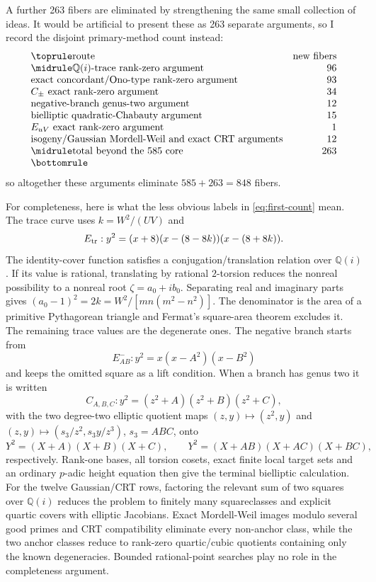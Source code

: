 \documentclass[11pt,a4paper]{amsart}
\newcommand{\Q}{\mathbb Q}
\begin{document}
A further 263 fibers are eliminated by strengthening the same small collection of ideas. It would be artificial to present these as 263 separate arguments, so I record the disjoint primary-method count instead:
\begin{equation}\label{eq:first-count}
\begin{array}{lr}
\toprule
\text{route} & \text{new fibers}\\
\midrule
\Q(i)\text{-trace rank-zero argument} & 96\\
\text{exact concordant/Ono-type rank-zero argument} & 93\\
C_\pm\text{ exact rank-zero argument} & 34\\
\text{negative-branch genus-two argument} & 12\\
\text{bielliptic quadratic-Chabauty argument} & 15\\
E_{uV}\text{ exact rank-zero argument} & 1\\
\text{isogeny/Gaussian Mordell-Weil and exact CRT arguments} & 12\\
\midrule
\text{total beyond the 585 core} & 263\\
\bottomrule
\end{array}
\end{equation}
so altogether these arguments eliminate $585+263=848$ fibers.

For completeness, here is what the less obvious labels in \eqref{eq:first-count} mean. The trace curve uses $k=W^2/(UV)$ and
\[
E_{\rm tr}:y^2=(x+8)(x-(8-8k))(x-(8+8k)).
\]
The identity-cover function satisfies a conjugation/translation relation over $\Q(i)$. If its value is rational, translating by rational $2$-torsion reduces the nonreal possibility to a nonreal root $\zeta=a_0+ib_0$. Separating real and imaginary parts gives $(a_0-1)^2=2k=W^2/[mn(m^2-n^2)]$. The denominator is the area of a primitive Pythagorean triangle and Fermat's square-area theorem excludes it. The remaining trace values are the degenerate ones. The negative branch starts from
\[
E^-_{AB}:y^2=x(x-A^2)(x-B^2)
\]
and keeps the omitted square as a lift condition. When a branch has genus two it is written
\[
C_{A,B,C}:y^2=(z^2+A)(z^2+B)(z^2+C),
\]
with the two degree-two elliptic quotient maps $(z,y)\mapsto(z^2,y)$ and $(z,y)\mapsto(s_3/z^2,s_3y/z^3)$, $s_3=ABC$, onto
\[
Y^2=(X+A)(X+B)(X+C),\qquad Y^2=(X+AB)(X+AC)(X+BC),
\]
respectively. Rank-one bases, all torsion cosets, exact finite local target sets and an ordinary $p$-adic height equation then give the terminal bielliptic calculation. For the twelve Gaussian/CRT rows, factoring the relevant sum of two squares over $\Q(i)$ reduces the problem to finitely many squareclasses and explicit quartic covers with elliptic Jacobians. Exact Mordell-Weil images modulo several good primes and CRT compatibility eliminate every non-anchor class, while the two anchor classes reduce to rank-zero quartic/cubic quotients containing only the known degeneracies. Bounded rational-point searches play no role in the completeness argument.
\end{document}
